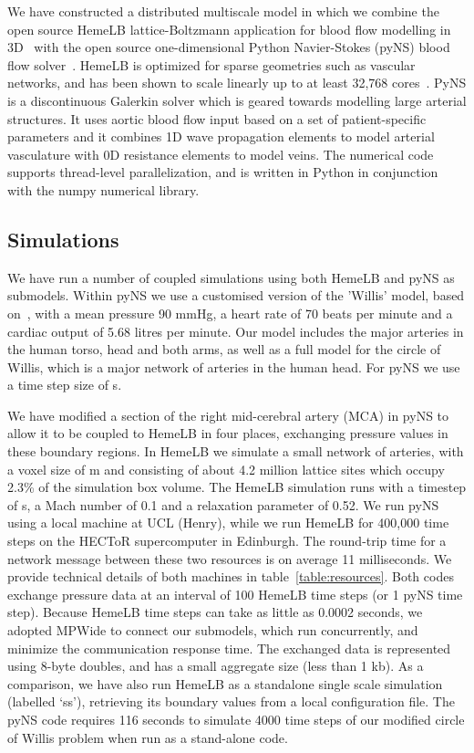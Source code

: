 \documentclass[a4,10pt]{article}
\begin{document}
We have constructed a distributed multiscale model in which we combine the open
source HemeLB lattice-Boltzmann application for blood flow modelling in
3D~\cite{Mazzeo:2008,Carver:2012} with the open source one-dimensional Python Navier-Stokes
(pyNS) blood flow solver~\cite{Botti:2010}. HemeLB is optimized for sparse
geometries such as vascular networks, and has been shown to scale linearly up
to at least 32,768 cores~\cite{Groen:2012}.  PyNS is a discontinuous Galerkin
solver which is geared towards modelling large arterial structures.  It uses
aortic blood flow input based on a set of patient-specific parameters and it
combines 1D wave propagation elements to model arterial vasculature with 0D
resistance elements to model veins. The numerical code supports thread-level
parallelization, and is written in Python in conjunction with the numpy
numerical library.

\subsection{Simulations}

We have run a number of coupled simulations using both HemeLB and pyNS as
submodels. Within pyNS we use a customised version of the 'Willis' model, based
on~\cite{Mulder:2011}, with a mean pressure 90 mmHg, a heart rate of 70 beats
per minute and a cardiac output of 5.68 litres per minute. Our model includes the
major arteries in the human torso, head and both arms, as well as a full model
for the circle of Willis, which is a major network of arteries in the human
head. For pyNS we use a time step size of  s.

We have modified a section of the right mid-cerebral artery (MCA) in pyNS to
allow it to be coupled to HemeLB in four places, exchanging pressure values in
these boundary regions. In HemeLB we simulate a small network of arteries, with
a voxel size of  m and consisting of about 4.2 million
lattice sites which occupy 2.3\% of the simulation box volume. The HemeLB
simulation runs with a timestep of  s, a Mach number of
0.1 and a relaxation parameter  of 0.52. We run pyNS using a local
machine at UCL (Henry), while we run HemeLB for 400,000 time steps on the
HECToR supercomputer in Edinburgh. The round-trip time for a network message
between these two resources is on average 11 milliseconds. We provide technical
details of both machines in table~\ref{table:resources}.  Both codes exchange pressure data at an
interval of 100 HemeLB time steps (or 1 pyNS time step). Because HemeLB time 
steps can take as little as 0.0002 seconds, we adopted MPWide to connect our submodels,
which run concurrently, and minimize the communication response time. The  exchanged 
data is represented using 8-byte doubles, and has a small
aggregate  size (less than 1 kb).  As a comparison, we have also run HemeLB as a standalone 
single scale simulation (labelled `ss'), retrieving its boundary values from a local configuration file. The pyNS code
requires 116 seconds to simulate 4000 time steps of our modified circle of
Willis problem when run as a stand-alone code.
\end{document}
